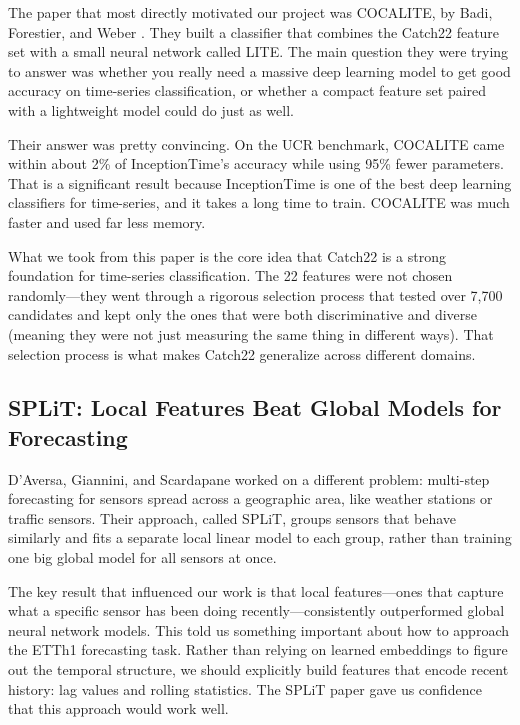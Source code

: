 \documentclass[10pt,conference]{IEEEtran}
\begin{document}
The paper that most directly motivated our project was COCALITE, by Badi, Forestier, and Weber \cite{cocalite}. They built a classifier that combines the Catch22 feature set with a small neural network called LITE. The main question they were trying to answer was whether you really need a massive deep learning model to get good accuracy on time-series classification, or whether a compact feature set paired with a lightweight model could do just as well.

Their answer was pretty convincing. On the UCR benchmark, COCALITE came within about 2\% of InceptionTime's accuracy while using 95\% fewer parameters. That is a significant result because InceptionTime is one of the best deep learning classifiers for time-series, and it takes a long time to train. COCALITE was much faster and used far less memory.

What we took from this paper is the core idea that Catch22 is a strong foundation for time-series classification. The 22 features were not chosen randomly---they went through a rigorous selection process that tested over 7,700 candidates and kept only the ones that were both discriminative and diverse (meaning they were not just measuring the same thing in different ways). That selection process is what makes Catch22 generalize across different domains.

\subsection{SPLiT: Local Features Beat Global Models for Forecasting}

D'Aversa, Giannini, and Scardapane \cite{split} worked on a different problem: multi-step forecasting for sensors spread across a geographic area, like weather stations or traffic sensors. Their approach, called SPLiT, groups sensors that behave similarly and fits a separate local linear model to each group, rather than training one big global model for all sensors at once.

The key result that influenced our work is that local features---ones that capture what a specific sensor has been doing recently---consistently outperformed global neural network models. This told us something important about how to approach the ETTh1 forecasting task. Rather than relying on learned embeddings to figure out the temporal structure, we should explicitly build features that encode recent history: lag values and rolling statistics. The SPLiT paper gave us confidence that this approach would work well.
\end{document}
